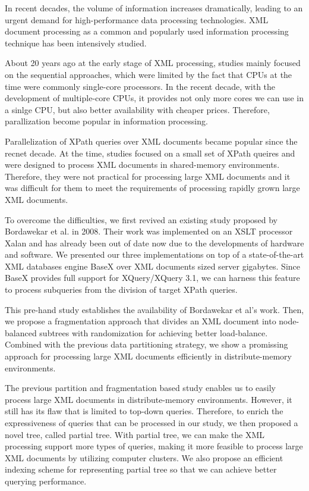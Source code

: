 \begin{abstracts}
	
In recent decades, the volume of information increases dramatically, leading to
an urgent demand for high-performance data processing technologies. XML document
processing as a common and popularly used information processing technique has
been intensively studied.

About 20 years ago at the early stage of XML processing, studies mainly focused
on the sequential approaches, which were limited by the fact that CPUs at the
time were commonly single-core processors. In the recent decade, with the
development of multiple-core CPUs, it provides not only more cores we can use in
a sinlge CPU, but also better availability with cheaper prices. Therefore,
parallization become popular in information processing.

Parallelization of XPath queries over XML documents became popular since the
recnet decade. At the time, studies focused on a small set of XPath queires and
were designed to process XML documents in shared-memory environments. Therefore,
they were not practical for processing large XML documents and it was difficult
for them to meet the requirements of processing rapidly grown large XML
documents.

To overcome the difficulties, we first revived an existing study proposed by
Bordawekar et al. in 2008. Their work was implemented on an XSLT processor Xalan
and has already been out of date now due to the developments of hardware and
software. We presented our three implementations on top of a state-of-the-art
XML databases engine BaseX over XML documents sized server gigabytes. Since
BaseX provides full support for XQuery/XQuery 3.1, we can harness this feature
to process subqueries from the division of target XPath queries.

This pre-hand study establishes the availability of Bordawekar et al's work.
Then, we propose a fragmentation approach that divides an XML document into
node-balanced subtrees with randomization for achieving better load-balance.
Combined with the previous data partitioning strategy, we show a promissing
approach for processing large XML documents efficiently in distribute-memory
environments.

The previous partition and fragmentation based study enables us to easily
process large XML documents in distribute-memory environments. However, it still
has its flaw that is limited to top-down queries. Therefore, to enrich the
expressiveness of queries that can be processed in our study, we then proposed a
novel tree, called partial tree. With partial tree, we can make the XML
processing support more types of queries, making it more feasible to process
large XML documents  by utilizing computer clusters. We also propose an
efficient indexing scheme for representing partial tree so that we can achieve
better querying performance.


\end{abstracts}

